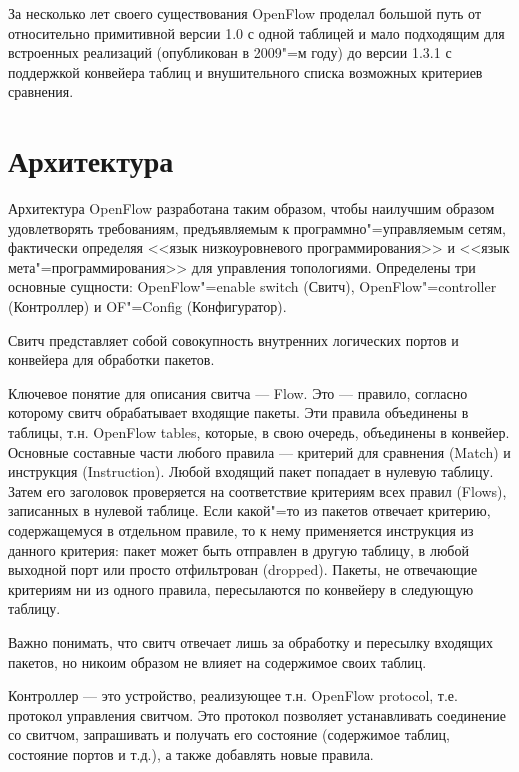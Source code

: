 \documentclass[10pt, a5paper]{article}
\begin{document}
За несколько лет своего существования OpenFlow проделал большой путь от относительно примитивной версии 1.0 с одной таблицей и мало подходящим для встроенных реализаций (опубликован в 2009"=м году) до версии 1.3.1 \cite{Orekhov2} с поддержкой конвейера таблиц и внушительного списка возможных критериев сравнения.

\section*{Архитектура}

Архитектура OpenFlow разработана таким образом, чтобы наилучшим образом удовлетворять требованиям, предъявляемым к \linebreak программно"=управляемым сетям, фактически определяя <<язык низкоуровневого программирования>> и <<язык мета"=программирования>> для управления топологиями.
Определены три основные сущности: OpenFlow"=enable switch (Свитч), OpenFlow"=controller (Контроллер) и OF"=Config (Конфигуратор).

Свитч представляет собой совокупность внутренних логических портов и конвейера для обработки пакетов.

Ключевое понятие для описания свитча --- Flow. Это --- правило, согласно которому свитч обрабатывает входящие пакеты. Эти правила объединены в таблицы, т.н. OpenFlow tables, которые, в свою очередь, объединены в конвейер. Основные составные части любого правила --- критерий для сравнения (Match) и инструкция (Instruction). Любой входящий пакет попадает в нулевую таблицу. Затем его заголовок проверяется на соответствие критериям всех правил (Flows), записанных в нулевой таблице. Если какой"=то из пакетов отвечает критерию, содержащемуся в отдельном правиле, то к нему применяется инструкция из данного критерия: пакет может быть отправлен в другую таблицу, в любой выходной порт или просто отфильтрован (dropped). Пакеты, не отвечающие критериям ни из одного правила, пересылаются по конвейеру в следующую таблицу.

Важно понимать, что свитч отвечает лишь за обработку и пересылку входящих пакетов, но никоим образом не влияет на содержимое своих таблиц.

Контроллер --- это устройство, реализующее т.н. OpenFlow \linebreak protocol, т.е. протокол управления свитчом. Это протокол позволяет устанавливать соединение со свитчом, запрашивать и получать его состояние (содержимое таблиц, состояние портов и т.д.), а также добавлять новые правила.
\end{document}
